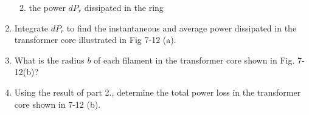 \documentclass[../../header.tex]{subfiles}
\begin{document}
\begin{enumerate}
\begin{enumerate}

\item the power $dP_r$ dissipated in the ring%


\end{enumerate}
\item Integrate $dP_r$ to find the instantaneous and average power dissipated in the transformer core illustrated in Fig 7-12 (a). %


\item What is the radius $b$ of each filament in the transformer core shown in Fig. 7-12(b)?%


\item Using the result of  part 2., determine the total power loss in the transformer core shown in 7-12 (b). %


\end{enumerate}
\end{document}
